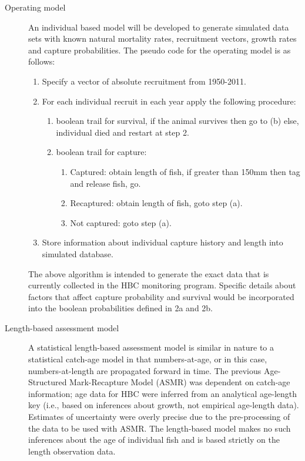 \begin{description}
	\item[Operating model] An individual based model will be developed to generate simulated data sets with known natural mortality rates, recruitment vectors, growth rates and capture probabilities.  The pseudo code for the operating model is as follows:
	\begin{enumerate}
		\item Specify a vector of absolute recruitment from 1950-2011.
		\item For each individual recruit in each year apply the following procedure:
		\begin{enumerate}
			\item boolean trail for survival, if the animal survives then go to (b) else, individual died and restart at step 2.
			\item boolean trail for capture:
			\begin{enumerate}
				\item Captured: obtain length of fish, if greater than 150mm then tag and release fish, go.
				\item Recaptured: obtain length of fish, goto step (a).
				\item Not captured: goto step (a).
			\end{enumerate}
		\end{enumerate}
		\item Store information about individual capture history and length into simulated database.
	\end{enumerate}
	The above algorithm is intended to generate the exact data that is currently collected in the HBC monitoring program. Specific details about factors that affect capture probability and survival would be incorporated into the boolean probabilities defined in 2a and 2b.
	
	\item[Length-based assessment model] A statistical length-based assessment model is similar in nature to a statistical catch-age model in that numbers-at-age, or in this case, numbers-at-length are propagated forward in time.  The previous Age-Structured Mark-Recapture Model (ASMR) was dependent on catch-age information; age data for HBC were inferred from an analytical age-length key (i.e., based on inferences about growth, not empirical age-length data).  Estimates of uncertainty were overly precise due to the pre-processing of the data to be used with ASMR. The length-based model makes no such inferences about the age of individual fish and is based strictly on the length observation data.  
	

\end{description}
